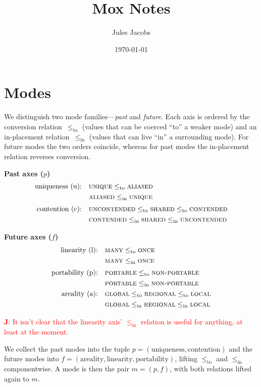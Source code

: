\documentclass{article}
\title{Mox Notes}
\author{Jules Jacobs}
\date{\today}
\newcommand{\leqto}{\mathrel{\leq_{\mathrm{to}}}}
\newcommand{\leqin}{\mathrel{\leq_{\mathrm{in}}}}
\newcommand{\mode}[1]{\textsc{#1}}
\newcommand{\jules}[1]{{\textcolor{red}{\textbf{J}: #1}}}
\begin{document}
\maketitle

\section{Modes}

We distinguish two mode families—\emph{past} and \emph{future}.
Each axis is ordered by the conversion relation~$\leqto$ (values that can be coerced ``to'' a weaker mode) and an in-placement relation~$\leqin$ (values that can live ``in'' a surrounding mode).
For future modes the two orders coincide, whereas for past modes the in-placement relation reverses conversion.

\medskip
\noindent\textbf{Past axes ($p$)}
\[
\begin{alignedat}{2}
\text{uniqueness (u):}&\quad \mode{unique} \leqto \mode{aliased}\\
&\quad \mode{aliased} \leqin \mode{unique}\\[0.5ex]
\text{contention (c):}&\quad \mode{uncontended} \leqto \mode{shared} \leqto \mode{contended}\\
&\quad \mode{contended} \leqin \mode{shared} \leqin \mode{uncontended}
\end{alignedat}
\]

\medskip
\noindent\textbf{Future axes ($f$)}
\[
\begin{alignedat}{2}
\text{linearity (l):}&\quad \mode{many} \leqto \mode{once} \\
&\quad \mode{many} \leqin \mode{once}\\[0.5ex]
\text{portability (p):}&\quad \mode{portable} \leqto \mode{non-portable}\\
&\quad \mode{portable} \leqin \mode{non-portable}\\
\text{areality (a):}&\quad \mode{global} \leqto \mode{regional} \leqto \mode{local}\\
&\quad \mode{global} \leqin \mode{regional} \leqin \mode{local}
\end{alignedat}
\]

\jules{It isn't clear that the linearity axis' $\leqin$ relation is useful for anything, at least at the moment.}

\medskip                               
We collect the past modes into the tuple $p = (\text{uniqueness}, \text{contention})$ and the future modes into $f = (\text{areality}, \text{linearity}, \text{portability})$, lifting $\leqto$ and $\leqin$ componentwise.
A mode is then the pair $m = (p, f)$, with both relations lifted again to $m$.
\end{document}
